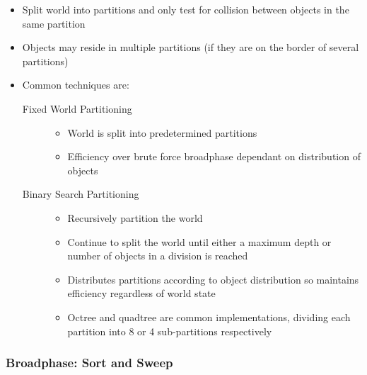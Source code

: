 \documentclass[a4paper]{article}
\begin{document}
\begin{itemize}
  \item
    Split world into partitions and only test for collision between objects in
    the same partition

  \item
    Objects may reside in multiple partitions (if they are on the border of
    several partitions)

  \item
    Common techniques are:
    \begin{description}
      \item[Fixed World Partitioning] \hfill
        \begin{itemize}
          \item
            World is split into predetermined partitions

          \item
            Efficiency over brute force broadphase dependant on distribution of
            objects

        \end{itemize}

      \item[Binary Search Partitioning] \hfill
        \begin{itemize}
          \item
            Recursively partition the world

          \item
            Continue to split the world until either a maximum depth or number
            of objects in a division is reached

          \item
            Distributes partitions according to object distribution so maintains
            efficiency regardless of world state

          \item
            Octree and quadtree are common implementations, dividing each
            partition into 8 or 4 sub-partitions respectively

        \end{itemize}

    \end{description}

\end{itemize}

\subsubsection{Broadphase: Sort and Sweep}
\end{document}
